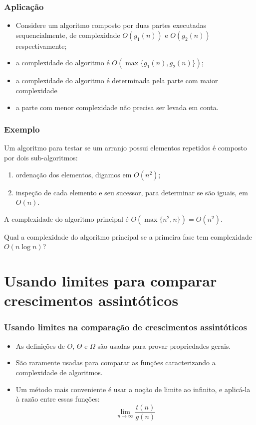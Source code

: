 \documentclass{beamer}
\begin{document}
\begin{frame}
\frametitle{Aplicação}
\begin{itemize}
\item Considere um algoritmo composto por duas partes executadas
  sequencialmente, de complexidade $O(g_1(n))$ e $O(g_2(n))$ respectivamente;
\item a complexidade do algoritmo é $O(\max\{g_1(n), g_2(n)\})$;
\item a complexidade do algoritmo é determinada pela parte com maior
  complexidade
\item a parte com menor complexidade não precisa ser levada em conta.
\end{itemize}

\end{frame}

\begin{frame}
\frametitle{Exemplo}

\begin{example}
  Um algoritmo para testar se um arranjo possui elementos repetidos é composto por dois sub-algoritmos:
  \begin{enumerate}
    \item ordenação dos elementos, digamos em $O(n^2)$;
    \item inspeção de cada elemento e seu sucessor, para determinar se são iguais, em $O(n)$.
    \end{enumerate}
    A complexidade do algoritmo principal é $O(\max\{n^2, n\}) = O(n^2)$.
\end{example}

\pause
\begin{problem}
  Qual a complexidade do algoritmo principal se a primeira fase tem complexidade
  $O(n \log n)$?
\end{problem}

\end{frame}

\section{Usando limites para comparar crescimentos assintóticos}

\begin{frame}
\frametitle{Usando limites na comparação de crescimentos assintóticos}

\begin{itemize}
\item As definições de $O$, $\Theta$ e $\Omega$ são usadas para 
  provar propriedades gerais.
\item São raramente usadas para comparar as funções caracterizando a
  complexidade de algoritmos.
\item Um método mais conveniente é usar a noção de limite ao infinito, e
  aplicá-la à razão entre essas funções:
  \[\lim_{n \to \infty} \frac{t(n)}{g(n)}\]
\end{itemize}

\end{frame}
\end{document}
